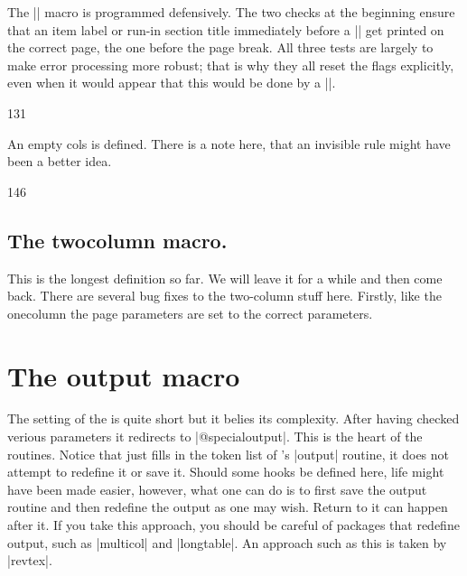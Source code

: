 \begin{teX}
The |\newpage| macro is programmed defensively. The two checks at the beginning ensure that an item label or run-in section title
immediately before a |\newpage| get printed on the correct page, the one before
the page break.
All three tests are largely to make error processing more robust; that is why
they all reset the 
flags explicitly, even when it would appear that this would be
done by a |\leavevmode|.

\begin{teXXX}
131 \def \newpage {%
132  \if@noskipsec
133    \ifx \@nodocument\relax
134      \leavevmode
135      \global \@noskipsecfalse
136    \fi
137 \fi
138 \if@inlabel
139   \leavevmode
140   \global \@inlabelfalse
141 \fi
142 \if@nobreak \@nobreakfalse \everypar{}\fi
143 \par
144 \vfil
145 \penalty -\@M}
\end{teXXX}

An empty cols is defined. There is a note here, that an invisible rule might have been a better idea.

\begin{teXXX}
146 \def \@emptycol {\vbox{}\penalty -\@M}
\end{teXXX}

\subsection{The \string twocolumn macro.} This is the longest definition so far. We will leave it for a while and then come back. There are several bug fixes to the two-column stuff here. Firstly, like the onecolumn the page parameters are set to the correct parameters.


\begin{teXXX}
147 \def \twocolumn {%
148 \clearpage
149 \global\columnwidth\textwidth
150 \global\advance\columnwidth-\columnsep
151 \global\divide\columnwidth\tw@
152 \global\hsize\columnwidth
153 \global\linewidth\columnwidth
154 \global\@twocolumntrue
155 \global\@firstcolumntrue
156 \col@number \tw@
\end{teXXX}



\section*{The output macro}

The setting of the  is quite short but it belies its complexity.
After having checked verious parameters it redirects to |@specialoutput|. This is the heart of the routines. Notice that \latex just fills in the token list of \tex's |output| routine, it does not attempt to redefine it or save it. 
Should some hooks be defined here, life might have been made easier, however, what one can do is to first save the \latex output routine and then redefine the output as one may wish. Return to it can happen after it. If you take this approach, you should be careful of packages that redefine output, such as |multicol| and |longtable|. An approach such as this is taken by |revtex|.


\end{teX}
